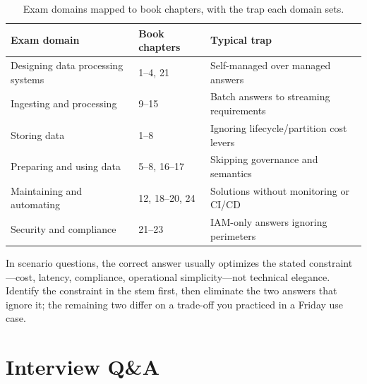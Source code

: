 \begin{table}[H]
\centering
\small
\begin{tabular}{@{}p{4.6cm}p{4.2cm}p{3.6cm}@{}} \\
\toprule
\textbf{Exam domain} & \textbf{Book chapters} & \textbf{Typical trap} \\
\midrule
Designing data processing systems & 1--4, 21 & Self-managed over managed answers \\
Ingesting and processing & 9--15 & Batch answers to streaming requirements \\
Storing data & 1--8 & Ignoring lifecycle/partition cost levers \\
Preparing and using data & 5--8, 16--17 & Skipping governance and semantics \\
Maintaining and automating & 12, 18--20, 24 & Solutions without monitoring or CI/CD \\
Security and compliance & 21--23 & IAM-only answers ignoring perimeters \\
\bottomrule
\end{tabular}
\caption{Exam domains mapped to book chapters, with the trap each domain sets.}
\label{tab:ch24-exam-domains}
\end{table}

\begin{tipbox}
In scenario questions, the correct answer usually optimizes the stated constraint---cost, latency, compliance, operational simplicity---not technical elegance. Identify the constraint in the stem first, then eliminate the two answers that ignore it; the remaining two differ on a trade-off you practiced in a Friday use case.
\end{tipbox}

\section{Interview Q\&A}
